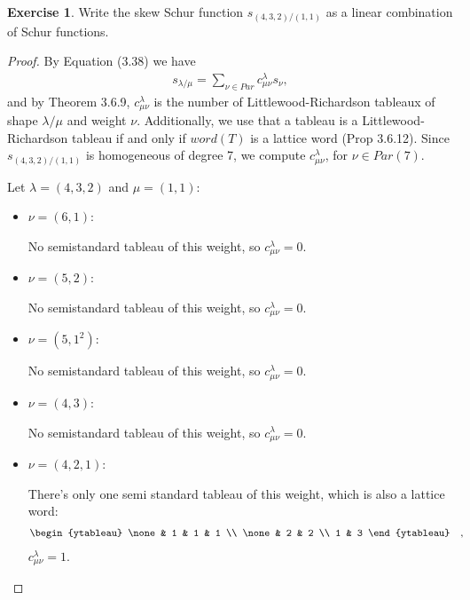 \documentclass[8pt]{extarticle}
\newcommand{\<}{\langle}
\renewcommand{\>}{\rangle}
\theoremstyle{definition}
\newtheorem{exercise}{Exercise}
\begin{document}
\newpage
\begin{exercise}
  Write the skew Schur function $s_{(4,3,2)/(1,1)}$ as a linear combination of Schur functions. 
\end{exercise}
\begin{proof}
   By Equation (3.38) we have 
  \begin{align*}
    s_{\lambda/\mu} = \sum\limits_{\nu \in Par} c_{\mu \nu}^{\lambda} s_{\nu},
  \end{align*}
  and by Theorem 3.6.9, $c_{\mu \nu}^{\lambda}$ is the number of Littlewood-Richardson tableaux of shape $\lambda/\mu$ and weight $\nu$. Additionally, we use that a tableau is a Littlewood-Richardson tableau if and only if $word(T)$ is a lattice word (Prop 3.6.12). Since $s_{(4,3,2)/(1,1)}$ is homogeneous of degree 7, we compute $c_{\mu \nu}^{\lambda}$, for $\nu \in Par(7)$.

  Let $\lambda = (4,3,2)$ and $\mu = (1,1)$:
  
  \begin{itemize}
  \item
    $\nu = (6,1)$:
    
    No semistandard tableau of this weight, so $c_{\mu \nu}^{\lambda} = 0$.
  \item
    $\nu = (5,2)$:
    
    No semistandard tableau of this weight, so $c_{\mu \nu}^{\lambda} = 0$.    

  \item
    $\nu = (5,1^2)$:

    No semistandard tableau of this weight, so $c_{\mu \nu}^{\lambda} = 0$.    
    
  \item
    $\nu = (4,3)$:

    No semistandard tableau of this weight, so $c_{\mu \nu}^{\lambda} = 0$.    
    
  \item 
    $\nu =  (4,2,1)$:

    There's only one semi standard tableau of this weight, which is also a lattice word:
    \begin{align*}
      \begin{ytableau}
        \none & 1 & 1 & 1 \\
        \none & 2 & 2 \\
        1 & 3
      \end{ytableau}\quad,\quad
    \end{align*}
    $c_{\mu \nu}^{\lambda} = 1 $.


\end{itemize}
\end{proof}
\end{document}
